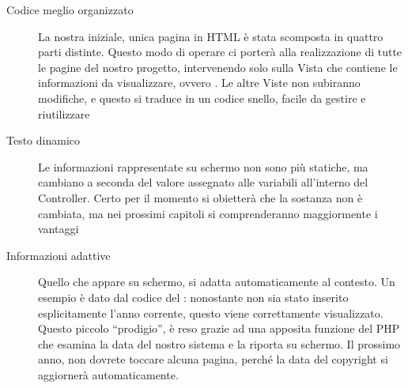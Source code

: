 \begin{description}
\item[Codice meglio organizzato] La nostra iniziale, unica pagina in \ac{HTML} è stata scomposta in quattro parti distinte. Questo modo di operare ci porterà alla realizzazione di tutte le pagine del nostro progetto, intervenendo solo sulla Vista che contiene le informazioni da visualizzare, ovvero . Le altre Viste non subiranno modifiche, e questo si traduce in un codice snello, facile da gestire e riutilizzare
\item[Testo dinamico] Le informazioni rappresentate su schermo non sono più statiche, ma cambiano a seconda del valore assegnato alle variabili all'interno del Controller. Certo per il momento si obietterà che la sostanza non è cambiata, ma nei prossimi capitoli si comprenderanno maggiormente i vantaggi
\item[Informazioni adattive] Quello che appare su schermo, si adatta automaticamente al contesto. Un esempio è dato dal codice del : nonostante non sia stato inserito esplicitamente l'anno corrente, questo viene correttamente visualizzato. Questo piccolo ``prodigio'', è reso grazie ad una apposita funzione del \ac{PHP} che esamina la data del nostro sistema e la riporta su schermo. Il prossimo anno, non dovrete toccare alcuna pagina, perché la data del copyright si aggiornerà automaticamente.
\end{description}